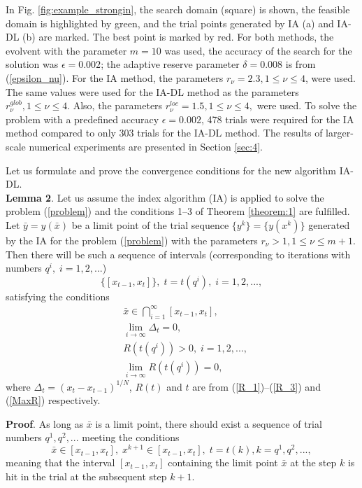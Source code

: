 \documentclass[twocolumn]{svjour3}          %
\begin{document}
	In Fig. \ref{fig:example_strongin}, the search domain (square) is shown, the feasible domain is highlighted by green, and the trial points generated by IA (a) and IA-DL (b) are marked. The best point is marked by red. For both methods, the evolvent with the parameter $m=10$ was used, the accuracy of the search for the solution was $\epsilon=0.002$; the adaptive reserve parameter $\delta=0.008$ is from (\ref{epsilon_nu}). For the IA method, the parameters $r_{\nu}=2.3, 1 \leq \nu \leq 4$, were used. The same values were used for the IA-DL method as the parameters $r_{\nu}^{glob}, 1 \leq \nu \leq 4$. Also, the parameters $r_{\nu}^{loc}=1.5, 1 \leq \nu \leq 4,$ were used. To solve the problem with a predefined accuracy $\epsilon=0.002$, 478 trials were required for the IA method compared to only 303 trials for the IA-DL method. The results of larger-scale numerical experiments are presented in Section \ref{sec:4}.

	Let us formulate and prove the convergence conditions for the new algorithm IA-DL.\\

	
	\textbf{Lemma 2}. 
Let us assume the index algorithm (IA) is applied to solve the problem (\ref{problem}) and the conditions 1--3 of Theorem \ref{theorem:1} are fulfilled.
Let $\bar{y}=y(\bar{x})$ be a limit point of the trial sequence $\{y^k\} = \{y(x^k)\}$ generated by the IA for the problem (\ref{problem}) with the parameters $r_{\nu}>1, 1 \leq \nu \leq m+1$.
Then there will be such a sequence of intervals (corresponding to iterations with numbers $q^i, \; i=1,2,...$)
\begin{equation}\label{intervals_t}
\{[x_{t-1},x_t]\}, \; t=t(q^i), \; i=1,2,...,
\end{equation}
satisfying the conditions
\begin{align}
&\bar{x} \in \bigcap_{i=1}^\infty [x_{t-1},x_t],\label{nested_int} \\ 
&\lim_{i\rightarrow\infty}\Delta_t = 0,\label{lim_delta_t} \\ 
&R(t(q^i))>0, \; i=1,2,...,\label{R_g_zero} \\ 
&\lim_{i\rightarrow\infty} R(t(q^i)) = 0, \label{lim_R}  
\end{align}
where $\Delta_t=(x_t-x_{t-1})^{1/N}$,  $R(t)$ and $t$ are from (\ref{R_1})--(\ref{R_3}) and (\ref{MaxR}) respectively.

\textbf{Proof}. As long as $\bar{x}$ is a limit point, there should exist a sequence of trial numbers $q^1, q^2,...$ meeting the conditions
\[
\bar{x} \in [x_{t-1}, x_t], \; x^{k+1} \in [x_{t-1}, x_t], \; t=t(k), k=q^1, q^2, ...,
\]
meaning that the interval $[x_{t-1}, x_t]$ containing the limit point $\bar{x}$ at the step $k$ is hit in the trial at the subsequent step $k+1$.
\end{document}
